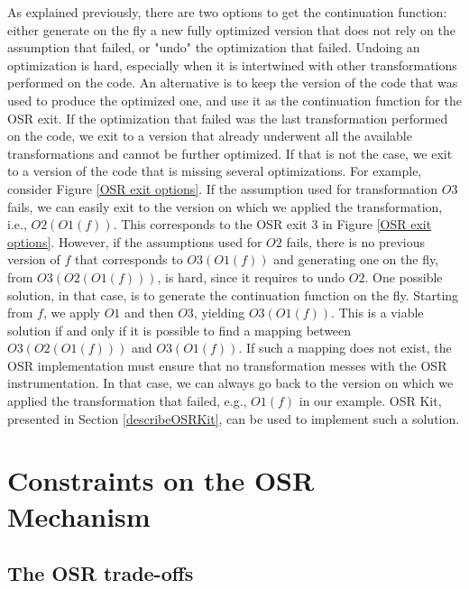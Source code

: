 As explained previously, there are two options to get the continuation function: either generate on the fly a new fully optimized version that does not rely on the assumption that failed, or "undo" the optimization that failed.
Undoing an optimization is hard, especially when it is intertwined with other transformations performed on the code.
An alternative is to keep the version of the code that was used to produce the optimized one, and use it as the continuation function for the OSR exit.
If the optimization that failed was the last transformation performed on the code, we exit to a version that already underwent all the available transformations and cannot be further optimized.
If that is not the case, we exit to a version of the code that is missing several optimizations.
For example, consider Figure \ref{OSR exit options}. 
If the assumption used for transformation $O3$ fails, we can easily exit to the version on which we applied the transformation, i.e., $O2(O1(f))$.
This corresponds to the OSR exit 3 in Figure \ref{OSR exit options}.
However, if the assumptions used for $O2$ fails, there is no previous version of $f$ that corresponds to $O3(O1(f))$ and generating one on the fly, from $O3(O2(O1(f)))$, is hard, since it requires to undo $O2$.
One possible solution, in that case, is to generate the continuation function on the fly.
Starting from $f$, we apply $O1$ and then $O3$, yielding $O3(O1(f))$.
This is a viable solution if and only if it is possible to find a mapping between $O3(O2(O1(f)))$ and $O3(O1(f))$.
If such a mapping does not exist, the OSR implementation must ensure that no transformation messes with the OSR instrumentation.
In that case, we can always go back to the version on which we applied the transformation that failed, e.g., $O1(f)$ in our example.
OSR Kit, presented in Section \ref{describeOSRKit}, can be used to implement such a solution.\\

\section{Constraints on the OSR Mechanism}
\subsection{The OSR trade-offs}\label{tradeOffs}

